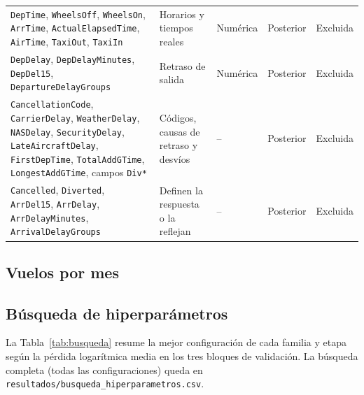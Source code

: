 \documentclass[11pt,a4paper]{article}
\newcommand{\code}[1]{\texttt{#1}}
\begin{document}
\begin{table}[!htbp]
\begin{tabularx}{\textwidth}{@{}L{4.6cm}XL{1.8cm}L{1.9cm}L{2.3cm}@{}}
\code{DepTime}, \code{WheelsOff}, \code{WheelsOn}, \code{ArrTime}, \code{ActualElapsedTime}, \code{AirTime}, \code{TaxiOut}, \code{TaxiIn} & Horarios y tiempos reales & Numérica & Posterior & Excluida \\
\addlinespace
\code{DepDelay}, \code{DepDelayMinutes}, \code{DepDel15}, \code{DepartureDelayGroups} & Retraso de salida & Numérica & Posterior & Excluida \\
\addlinespace
\code{CancellationCode}, \code{CarrierDelay}, \code{WeatherDelay}, \code{NASDelay}, \code{SecurityDelay}, \code{LateAircraftDelay}, \code{FirstDepTime}, \code{TotalAddGTime}, \code{LongestAddGTime}, campos \code{Div*} & Códigos, causas de retraso y desvíos & -- & Posterior & Excluida \\
\addlinespace
\code{Cancelled}, \code{Diverted}, \code{ArrDel15}, \code{ArrDelay}, \code{ArrDelayMinutes}, \code{ArrivalDelayGroups} & Definen la respuesta o la reflejan & -- & Posterior & Excluida \\
\bottomrule
\end{tabularx}
\end{table}
\FloatBarrier
 
\subsection{Vuelos por mes}
\begin{table}[ht]
\centering
\caption{Número de vuelos por mes y año.}
\label{tab:mes}
\end{table}
 
\subsection{Búsqueda de hiperparámetros}
La Tabla~\ref{tab:busqueda} resume la mejor configuración de cada familia y etapa según la pérdida logarítmica media en los tres bloques de validación. La búsqueda completa (todas las configuraciones) queda en \code{resultados/busqueda\_hiperparametros.csv}.
 
\end{document}
